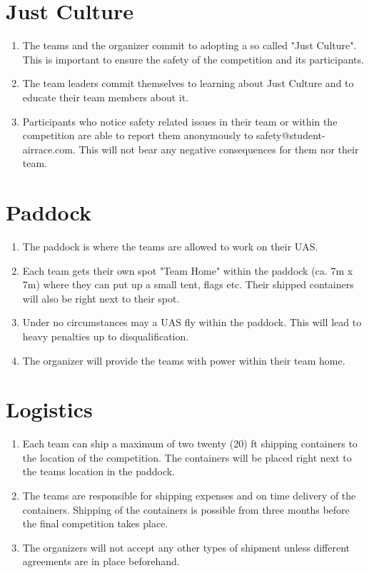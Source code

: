     \section{Just Culture}
    \begin{enumerate}
      \item The teams and the organizer commit to adopting a so called "Just Culture". This is important to ensure the safety of the competition and its participants.
      \item The team leaders commit themselves to learning about Just Culture and to educate their team members about it.
      \item Participants who notice safety related issues in their team or within the competition are able to report them anonymously  to safety@student-airrace.com. This will not bear any
      negative consequences for them nor their team. 
    \end{enumerate}

    \section{Paddock}
    \begin{enumerate}
      \item The paddock is where the teams are allowed to work on their UAS. 
      \item Each team gets their own spot "Team Home" within the paddock (ca. 7m x 7m) where they can put up a small tent, flags etc. Their shipped containers will also be right next to their spot. 
      \item Under no circumstances may a UAS fly within the paddock. This will lead to heavy penalties up to disqualification. 
      \item The organizer will provide the teams with power within their team home.    
    \end{enumerate}

    \section{Logistics}
    \begin{enumerate}
      \item Each team can ship a maximum of two twenty (20) ft shipping containers to the location of the competition. The containers will be placed right next to the teams location in the paddock.
      \item The teams are responsible for shipping expenses and on time delivery of the containers. Shipping of the containers is possible from three months before the final competition takes place.
      \item The organizers will not accept any other types of shipment unless different agreements are in place beforehand.
    \end{enumerate}

